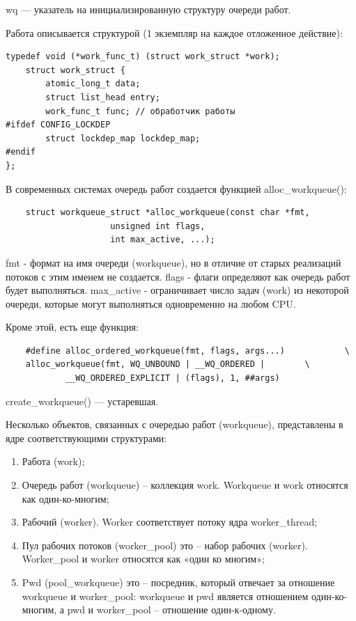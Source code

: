 wq --- указатель на инициализированную структуру очереди работ.

Работа описывается структурой (1 экземпляр на каждое отложенное действие):

\begin{lstlisting}
typedef void (*work_func_t) (struct work_struct *work);
	struct work_struct {
        atomic_long_t data;
        struct list_head entry;
        work_func_t func; // обработчик работы
#ifdef CONFIG_LOCKDEP
        struct lockdep_map lockdep_map;
#endif
};
\end{lstlisting}

В современных системах очередь работ создается функцией alloc\_workqueue():

\begin{lstlisting}
	struct workqueue_struct *alloc_workqueue(const char *fmt,
					 unsigned int flags,
					 int max_active, ...);
\end{lstlisting}

fmt - формат на имя очереди (workqueue), но в отличие от старых реализаций потоков с этим именем не создается. flags - флаги определяют как очередь работ будет выполняться. max\_active - ограничивает число задач (work) из некоторой очереди, которые могут выполняться одновременно на любом CPU.

Кроме этой, есть еще функция:
\begin{lstlisting}
	#define alloc_ordered_workqueue(fmt, flags, args...)			\
	alloc_workqueue(fmt, WQ_UNBOUND | __WQ_ORDERED |		\
			__WQ_ORDERED_EXPLICIT | (flags), 1, ##args)
\end{lstlisting}

create\_workqueue() --- устаревшая.

Несколько объектов, связанных с очередью работ (workqueue), представлены в ядре соответствующими структурами:
\begin{enumerate}
	\item Работа (work);
	\item Очередь работ (workqueue) – коллекция work. Workqueue и work относятся как один-ко-многим;
	\item Рабочий (worker). Worker соответствует потоку ядра worker\_thread;
	\item Пул рабочих потоков (worker\_pool) это – набор рабочих (worker). Worker\_pool и worker относятся как «один ко многим»;
	\item Pwd (pool\_workqueue) это – посредник, который отвечает за отношение workqueue и worker\_pool: workqueue и pwd является отношением один-ко-многим, а pwd и worker\_pool – отношение один-к-одному.
\end{enumerate}

